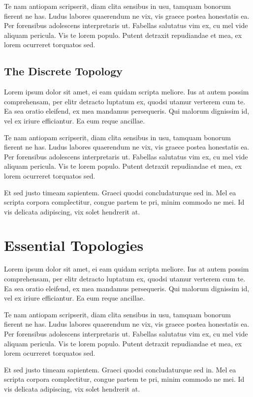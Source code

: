 \documentclass[12pt, a4paper]{article}
\theoremstyle{definition}
\theoremstyle{remark}
\numberwithin{equation}{section}
\numberwithin{figure}{section}
\numberwithin{table}{section}
\begin{document}
            Te nam antiopam scripserit, diam clita sensibus in usu, tamquam bonorum fierent ne has. Ludus labores quaerendum ne vix, vis graece postea honestatis ea. Per forensibus adolescens interpretaris ut. Fabellas salutatus vim ex, cu mel vide aliquam pericula. Vis te lorem populo. Putent detraxit repudiandae et mea, ex lorem ocurreret torquatos sed.
        \subsection{The Discrete Topology}
            Lorem ipsum dolor sit amet, ei eam quidam scripta meliore. Ius at autem possim comprehensam, per elitr detracto luptatum ex, quodsi utamur verterem cum te. Ea sea oratio eleifend, ex mea mandamus persequeris. Qui malorum dignissim id, vel ex iriure efficiantur. Ea eum reque ancillae.

            Te nam antiopam scripserit, diam clita sensibus in usu, tamquam bonorum fierent ne has. Ludus labores quaerendum ne vix, vis graece postea honestatis ea. Per forensibus adolescens interpretaris ut. Fabellas salutatus vim ex, cu mel vide aliquam pericula. Vis te lorem populo. Putent detraxit repudiandae et mea, ex lorem ocurreret torquatos sed.

            Et sed justo timeam sapientem. Graeci quodsi concludaturque sed in. Mel ea scripta corpora complectitur, congue partem te pri, minim commodo ne mei. Id vis delicata adipiscing, vix solet hendrerit at.
    
    \newpage
    \section{Essential Topologies}
        Lorem ipsum dolor sit amet, ei eam quidam scripta meliore. Ius at autem possim comprehensam, per elitr detracto luptatum ex, quodsi utamur verterem cum te. Ea sea oratio eleifend, ex mea mandamus persequeris. Qui malorum dignissim id, vel ex iriure efficiantur. Ea eum reque ancillae.

        Te nam antiopam scripserit, diam clita sensibus in usu, tamquam bonorum fierent ne has. Ludus labores quaerendum ne vix, vis graece postea honestatis ea. Per forensibus adolescens interpretaris ut. Fabellas salutatus vim ex, cu mel vide aliquam pericula. Vis te lorem populo. Putent detraxit repudiandae et mea, ex lorem ocurreret torquatos sed.

        Et sed justo timeam sapientem. Graeci quodsi concludaturque sed in. Mel ea scripta corpora complectitur, congue partem te pri, minim commodo ne mei. Id vis delicata adipiscing, vix solet hendrerit at.
\end{document}

